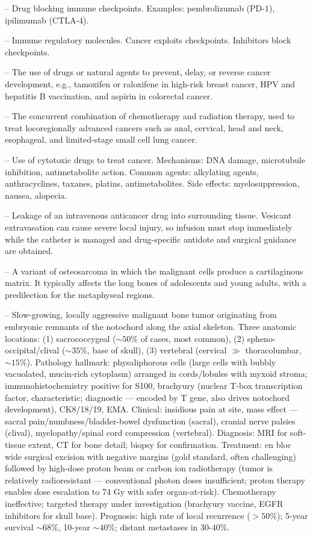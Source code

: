-- Drug blocking immune checkpoints. Examples: pembrolizumab (PD-1), ipilimumab (CTLA-4).

-- Immune regulatory molecules. Cancer exploits checkpoints. Inhibitors block checkpoints.

-- The use of drugs or natural agents to prevent, delay, or reverse cancer development, e.g., tamoxifen or raloxifene in high-risk breast cancer, HPV and hepatitis B vaccination, and aspirin in colorectal cancer.

-- The concurrent combination of chemotherapy and radiation therapy, used to treat locoregionally advanced cancers such as anal, cervical, head and neck, esophageal, and limited-stage small cell lung cancer.

-- Use of cytotoxic drugs to treat cancer. Mechanisms: DNA damage, microtubule inhibition, antimetabolite action. Common agents: alkylating agents, anthracyclines, taxanes, platins, antimetabolites. Side effects: myelosuppression, nausea, alopecia.

-- Leakage of an intravenous anticancer drug into surrounding tissue. Vesicant extravasation can cause severe local injury, so infusion must stop immediately while the catheter is managed and drug-specific antidote and surgical guidance are obtained.

-- A variant of osteosarcoma in which the malignant cells produce a cartilaginous matrix. It typically affects the long bones of adolescents and young adults, with a predilection for the metaphyseal regions.

-- Slow-growing, locally aggressive malignant bone tumor originating from embryonic remnants of the notochord along the axial skeleton. Three anatomic locations: (1) sacrococcygeal ($\sim 50\%$ of cases, most common), (2) spheno-occipital/clival ($\sim 35\%$, base of skull), (3) vertebral (cervical $\gg$ thoracolumbar, $\sim 15\%$). Pathology hallmark: physaliphorous cells (large cells with bubbly vacuolated, mucin-rich cytoplasm) arranged in cords/lobules with myxoid stroma; immunohistochemistry positive for S100, brachyury (nuclear T-box transcription factor, characteristic; diagnostic — encoded by T gene, also drives notochord development), CK8/18/19, EMA. Clinical: insidious pain at site, mass effect — sacral pain/numbness/bladder-bowel dysfunction (sacral), cranial nerve palsies (clival), myelopathy/spinal cord compression (vertebral). Diagnosis: MRI for soft-tissue extent, CT for bone detail; biopsy for confirmation. Treatment: en bloc wide surgical excision with negative margins (gold standard, often challenging) followed by high-dose proton beam or carbon ion radiotherapy (tumor is relatively radioresistant — conventional photon doses insufficient; proton therapy enables dose escalation to 74 Gy with safer organ-at-risk). Chemotherapy ineffective; targeted therapy under investigation (brachyury vaccine, EGFR inhibitors for skull base). Prognosis: high rate of local recurrence ($> 50\%$); 5-year survival $\sim 68\%$, 10-year $\sim 40\%$; distant metastases in 30-40\%.

